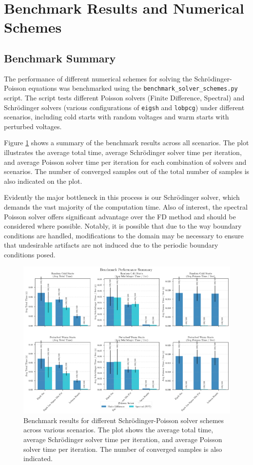 \documentclass{article}
\begin{document}
\section{Benchmark Results and Numerical Schemes}

\subsection{Benchmark Summary}

The performance of different numerical schemes for solving the Schrödinger-Poisson equations was benchmarked using the \texttt{benchmark\_solver\_schemes.py} script. The script tests different Poisson solvers (Finite Difference, Spectral) and Schrödinger solvers (various configurations of \texttt{eigsh} and \texttt{lobpcg}) under different scenarios, including cold starts with random voltages and warm starts with perturbed voltages.

Figure \ref{fig:benchmark_summary} shows a summary of the benchmark results across all scenarios. The plot illustrates the average total time, average Schrödinger solver time per iteration, and average Poisson solver time per iteration for each combination of solvers and scenarios. The number of converged samples out of the total number of samples is also indicated on the plot.

Evidently the major bottleneck in this process is our Schrödinger solver, which demands the vast majority of the computation time. Also of interest, the spectral Poisson solver offers significant advantage over the FD method and should be considered where possible. Notably, it is possible that due to the way boundary conditions are handled, modifications to the domain may be necessary to ensure that undesirable artifacts are not induced due to the periodic boundary conditions posed.
\begin{figure}[h!]
	\centering
	\includegraphics[width=\textwidth]{../figures/my_benchmark_results.png}
	\caption{Benchmark results for different Schrödinger-Poisson solver schemes across various scenarios. The plot shows the average total time, average Schrödinger solver time per iteration, and average Poisson solver time per iteration. The number of converged samples is also indicated.}
	\label{fig:benchmark_summary}
\end{figure}
\end{document}
